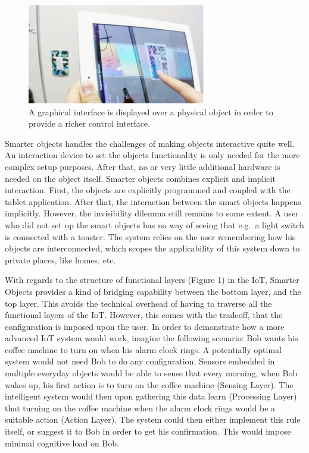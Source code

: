 \begin{figure}[!t]
	\centering
	\includegraphics[width=0.9\columnwidth]{Images/smarterObjectsGUI}
	\caption{A graphical interface is displayed over a physical object in order to provide a richer control interface. \cite{heun13smarter}}
	\label{fig:smarterObjectsGUI}
\end{figure}

Smarter objects handles the challenges of making objects interactive quite well. 
An interaction device to set the objects functionality is only needed for the more complex setup purposes. 
After that, no or very little additional hardware is needed on the object itself.
Smarter objects combines explicit and implicit interaction.
First, the objects are explicitly programmed and coupled with the tablet application.
After that, the interaction between the smart objects happens implicitly. 
However, the invisibility dilemma still remains to some extent.
A user who did not set up the smart objects has no way of seeing that e.g.\ a light switch is connected with a toaster.
The system relies on the user remembering how his objects are interconnected, which scopes the applicability of this system down to private places, like homes, etc.

With regards to the structure of functional layers (Figure 1) in the IoT, Smarter Objects provides a kind of bridging capability between the bottom layer, and the top layer.
This avoids the technical overhead of having to traverse all the functional layers of the IoT.
However, this comes with the tradeoff, that the configuration is imposed upon the user. 
In order to demonstrate how a more advanced IoT system would work, imagine the following scenario: Bob wants his coffee machine to turn on when his alarm clock rings.
A potentially optimal system would not need Bob to do any configuration.
Sensors embedded in multiple everyday objects would be able to sense that every morning, when Bob wakes up, his first action is to turn on the coffee machine (Sensing Layer).
The intelligent system would then upon gathering this data learn (Processing Layer) that turning on the coffee machine when the alarm clock rings would be a suitable action (Action Layer).
The system could then either implement this rule itself, or suggest it to Bob in order to get his confirmation.
This would impose minimal cognitive load on Bob. 

